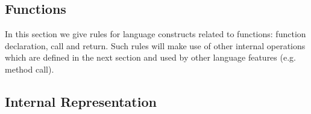 \documentclass{article}
\begin{document}
\begin{kdefinition}
\begin{module}{}
\begin{syntaxBlock}{}
\end{syntaxBlock}

\begin{syntaxBlock}{}
\end{syntaxBlock}
\end{module}
\begin{module}{}
\begin{kblock}[text]
 \section{Functions} 
		In this section we give rules for language constructs related to functions: function
		declaration, call and return. Such rules will make use of other internal operations
		which are defined in the next section and used by other language features (e.g. 
		method call). \end{kblock}
\begin{kblock}[text]
 \subsection{Internal Representation} \end{kblock}

\begin{syntaxBlock}{}
\end{syntaxBlock}


\end{module}
\end{kdefinition}
\end{document}
